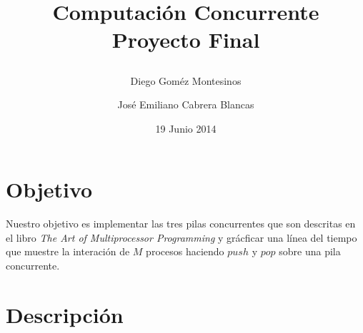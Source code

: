 \documentclass{article}
\title{ Computación Concurrente \\ \Large{Proyecto Final}
\author{
  Diego Goméz Montesinos
  \and
  José Emiliano Cabrera Blancas
  }
\date{19 Junio 2014}
}
\begin{document}
\maketitle
\section{Objetivo}
Nuestro objetivo es implementar las tres pilas concurrentes que son descritas 
en el libro \textsl{The Art of Multiprocessor Programming} y grácficar una línea
del tiempo que muestre la interación de $M$ procesos haciendo $push$ y $pop$ sobre
una pila concurrente.

\section{Descripción}
\end{document}
